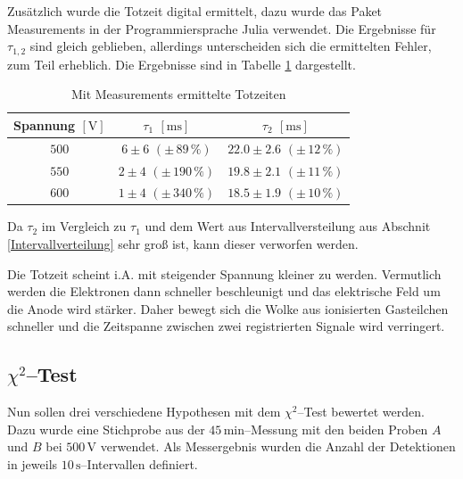 \documentclass[12pt,a4paper]{scrartcl}
\numberwithin{equation}{section} %
\newcommand{\code}[1]{\textsf{#1}}
\begin{document}
\noindent
Zusätzlich wurde die Totzeit digital ermittelt, dazu wurde das Paket \code{Measurements} in der Programmiersprache \code{Julia} verwendet. \cite{Julia:Measurements} Die Ergebnisse für $\tau _{1,2}$ sind gleich geblieben, allerdings unterscheiden sich die ermittelten Fehler, zum Teil erheblich. Die Ergebnisse sind in Tabelle \ref{tab:Totzeit m. Julia} dargestellt.

\begin{table}[h!]
	\centering
	\begin{tabular}[h]{c|c|c}
		Spannung $[\mathrm V]$
			& $\tau_1$ $[\mathrm{ms}]$
			& $\tau_2$ $[\mathrm{ms}]$ \\
		\hline
		$500$ & $6 \pm 6$ $(\pm\, 89\,\%)$ & $22.0 \pm 2.6$ $(\pm\, 12\,\%)$  \\
		$550$ & $2 \pm 4$ $(\pm\, 190\,\%)$ & $19.8 \pm 2.1$ $(\pm\, 11\,\%)$ \\
		$600$ & $1 \pm 4$ $(\pm\, 340\,\%)$ & $18.5 \pm 1.9$ $(\pm\, 10\,\%)$ \\
	\end{tabular}
	\caption{Mit \code{Measurements} \cite{Julia:Measurements} ermittelte Totzeiten}
	\label{tab:Totzeit m. Julia}
\end{table}

\noindent
Da $\tau _2$ im Vergleich zu $\tau _1$ und dem Wert aus Intervallversteilung aus Abschnit \ref{Intervallverteilung} sehr groß ist, kann dieser verworfen werden.

Die Totzeit scheint i.A. mit steigender Spannung kleiner zu werden. Vermutlich werden die Elektronen dann schneller beschleunigt und das elektrische Feld um die Anode wird stärker. Daher bewegt sich die Wolke aus ionisierten Gasteilchen schneller und die Zeitspanne zwischen zwei registrierten Signale wird verringert.

\hypertarget{chi2test}{\subsection{$\chi^2$--Test}\label{chi2test}}

Nun sollen drei verschiedene Hypothesen mit dem $\chi^2$--Test bewertet werden. Dazu wurde eine Stichprobe aus der $45\mathrm{\,min}$--Messung mit den beiden Proben $A$ und $B$ bei $500\mathrm{\,V}$ verwendet. Als Messergebnis wurden die Anzahl der Detektionen in jeweils $10\mathrm{\,s}$--Intervallen definiert.
\end{document}
